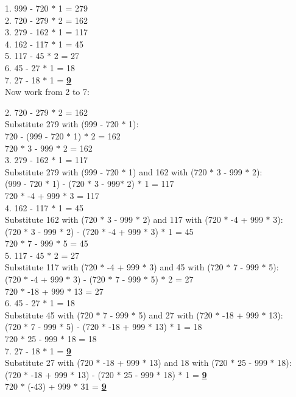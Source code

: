 \documentclass[11pt]{article}
\begin{document}
\begin{enumerate}
1. 999 - 720 $*$ 1 = 279\\
2. 720 - 279 $*$ 2 = 162\\
3. 279 - 162 $*$ 1 = 117\\
4. 162 - 117 $*$ 1 = 45\\
5. 117 - 45 $*$ 2 = 27\\
6. 45 - 27 $*$ 1 = 18\\
7. 27 - 18 $*$ 1 = \underline{\textbf{9}}\\

Now work from 2 to 7:

2. 720 - 279 $*$ 2 = 162\\
Substitute 279 with (999 - 720 $*$ 1):\\
720 - (999 - 720 $*$ 1) $*$ 2 = 162\\
720 $*$ 3 - 999 $*$ 2 = 162\\

3. 279 - 162 $*$ 1 = 117\\
Substitute 279 with (999 - 720 $*$ 1) and 162 with (720 $*$ 3 - 999
$*$ 2):\\
(999 - 720 $*$ 1) - (720 $*$ 3 - 999$*$ 2) $*$ 1 = 117\\
720 $*$ -4 + 999 $*$ 3 = 117\\

4. 162 - 117 $*$ 1 = 45\\
Substitute 162 with (720 $*$ 3 - 999 $*$ 2) and 117 with (720 $*$ -4 +
999 $*$ 3):\\ 
(720 $*$ 3 - 999 $*$ 2) - (720 $*$ -4 + 999 $*$ 3) $*$ 1 = 45\\
720 $*$ 7 - 999 $*$ 5 = 45\\

5. 117 - 45 $*$ 2 = 27\\
Substitute 117 with (720 $*$ -4 + 999 $*$ 3) and 45 with (720 $*$ 7 -
999 $*$ 5):\\
(720 $*$ -4 + 999 $*$ 3) - (720 $*$ 7 - 999 $*$ 5) $*$ 2 = 27\\
720 $*$ -18 + 999 $*$ 13 = 27\\

6. 45 - 27 $*$ 1 = 18\\
Substitute 45 with (720 $*$ 7 - 999 $*$ 5) and 27 with (720 $*$ -18 +
999 $*$ 13):\\
(720 $*$ 7 - 999 $*$ 5) - (720 $*$ -18 + 999 $*$ 13) $*$ 1 = 18\\
720 $*$ 25 - 999 $*$ 18 = 18\\

7. 27 - 18 $*$ 1 = \underline{\textbf{9}}\\
Substitute 27 with (720 $*$ -18 + 999 $*$ 13) and 18 with (720 $*$ 25
- 999 $*$ 18):\\ 
(720 $*$ -18 + 999 $*$ 13) - (720 $*$ 25 - 999 $*$ 18) $*$ 1 =
\underline{\textbf{9}}\\
720 $*$ (-43) + 999 $*$ 31 = \underline{\textbf{9}}


\end{enumerate}
\end{document}

